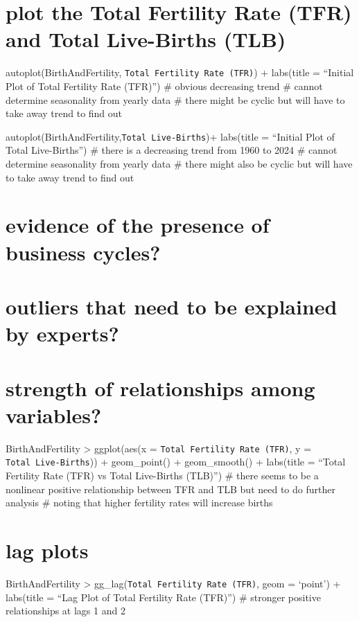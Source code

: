 \documentclass[
]{article}
\begin{document}
\section{plot the Total Fertility Rate (TFR) and Total Live-Births
(TLB)}\label{plot-the-total-fertility-rate-tfr-and-total-live-births-tlb}

autoplot(BirthAndFertility, \texttt{Total\ Fertility\ Rate\ (TFR)}) +
labs(title = ``Initial Plot of Total Fertility Rate (TFR)'') \# obvious
decreasing trend \# cannot determine seasonality from yearly data \#
there might be cyclic but will have to take away trend to find out

autoplot(BirthAndFertility,\texttt{Total\ Live-Births})+ labs(title =
``Initial Plot of Total Live-Births'') \# there is a decreasing trend
from 1960 to 2024 \# cannot determine seasonality from yearly data \#
there might also be cyclic but will have to take away trend to find out

\section{evidence of the presence of business
cycles?}\label{evidence-of-the-presence-of-business-cycles}

\section{outliers that need to be explained by
experts?}\label{outliers-that-need-to-be-explained-by-experts}

\section{strength of relationships among
variables?}\label{strength-of-relationships-among-variables}

BirthAndFertility \textbar\textgreater{} ggplot(aes(x =
\texttt{Total\ Fertility\ Rate\ (TFR)}, y =
\texttt{Total\ Live-Births})) + geom\_point() + geom\_smooth() +
labs(title = ``Total Fertility Rate (TFR) vs Total Live-Births (TLB)'')
\# there seems to be a nonlinear positive relationship between TFR and
TLB but need to do further analysis \# noting that higher fertility
rates will increase births

\section{lag plots}\label{lag-plots}

BirthAndFertility \textbar\textgreater{}
gg\_lag(\texttt{Total\ Fertility\ Rate\ (TFR)}, geom = `point') +
labs(title = ``Lag Plot of Total Fertility Rate (TFR)'') \# stronger
positive relationships at lags 1 and 2
\end{document}
